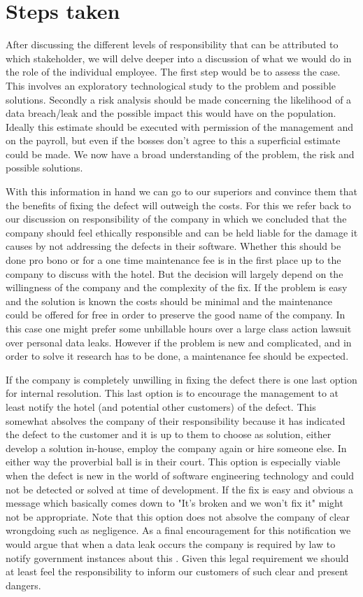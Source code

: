 \section{Steps taken}
After discussing the different levels of responsibility that can be attributed to which stakeholder, we will delve deeper into a discussion of what we would do in the role of the individual employee. The first step would be to assess the case. This involves an exploratory technological study to the problem and possible solutions. Secondly a risk analysis should be made concerning the likelihood of a data breach/leak and the possible impact this would have on the population. Ideally this estimate should be executed with permission of the management and on the payroll, but even if the bosses don't agree to this a superficial estimate could be made. We now have a broad understanding of the problem, the risk and possible solutions. 

With this information in hand we can go to our superiors and convince them that the benefits of fixing the defect will outweigh the costs. For this we refer back to our discussion on responsibility of the company in which we concluded that the company should feel ethically responsible and can be held liable for the damage it causes by not addressing the defects in their software. Whether this should be done pro bono or for a one time maintenance fee is in the first place up to the company to discuss with the hotel. But the decision will largely depend on the willingness of the company and the complexity of the fix. If the problem is easy and the solution is known the costs should be minimal and the maintenance could be offered for free in order to preserve the good name of the company. In this case one might prefer some unbillable hours over a large class action lawsuit over personal data leaks. However if the problem is new and complicated, and in order to solve it research has to be done, a maintenance fee should be expected.

If the company is completely unwilling in fixing the defect there is one last option for internal resolution. This last option is to encourage the management  to at least notify the hotel (and potential other customers) of the defect. This somewhat absolves the company of their responsibility because it has indicated the defect to the customer and it is up to them to choose as solution, either develop a solution in-house, employ the company again or hire someone else. In either way the proverbial ball is in their court. This option is especially viable when the defect is new in the world of software engineering technology and could not be detected or solved at time of development. If the fix is easy and obvious a message which basically comes down to "It's broken and we won't fix it" might not be appropriate. Note that this option does not absolve the company of clear wrongdoing such as negligence. As a final encouragement for this notification we would argue that when a data leak occurs the company is required by law to notify government instances about this \cite{privacy_directive}. Given this legal requirement we should at least feel the responsibility to inform our customers of such clear and present dangers.

